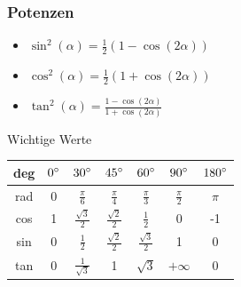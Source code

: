 \documentclass[a4paper,10pt]{article}
\begin{document}
    \subsubsection{Potenzen}
    \begin{itemize}
        \item $\sin^2(\alpha) = \frac{1}{2}(1-\cos(2\alpha))$
        \item $\cos^2(\alpha) = \frac{1}{2}(1+\cos(2\alpha))$
        \item $\tan^2(\alpha) = \frac{1-\cos(2\alpha)}{1+\cos(2\alpha)}$
    \end{itemize}
    
    
    
    
    \begin{mainbox}{Wichtige Werte}
        \begin{center} 
            \begin{tabular}{c|cccccc}
                deg & $0 \degree $ & $30 \degree $        & $45 \degree $        & $60 \degree $        & $90 \degree $   & $180 \degree $ \\
                \hline
                rad & 0            & $\frac{\pi}{6}$      & $\frac{\pi}{4}$      & $\frac{\pi}{3}$      & $\frac{\pi}{2}$ & $\pi$          \\
                cos & 1            & $\frac{\sqrt{3}}{2}$ & $\frac{\sqrt{2}}{2}$ & $\frac{1}{2}$        & 0               & -1             \\
                sin & 0            & $\frac{1}{2}$        & $\frac{\sqrt{2}}{2}$ & $\frac{\sqrt{3}}{2}$ & 1               & 0              \\
                tan & 0            & $\frac{1}{\sqrt{3}}$ & 1                    & $\sqrt{3}$           & $+\infty$       & 0              \\
            \end{tabular}
        \end{center} 
    \end{mainbox}
    
\end{document}
